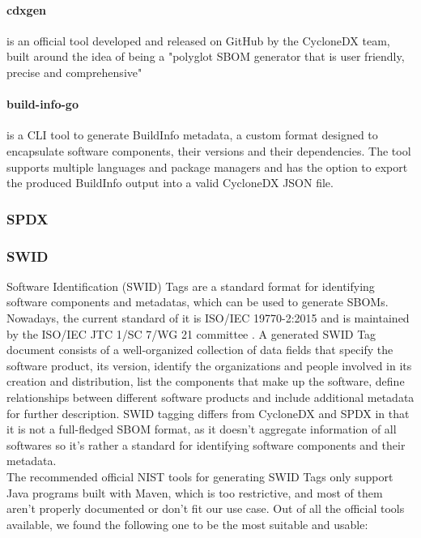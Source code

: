 \paragraph{cdxgen} is an official tool developed and released on GitHub by the CycloneDX team, built around the idea of being a "polyglot SBOM generator that is user friendly, precise and comprehensive"

\paragraph{build-info-go} is a CLI tool to generate BuildInfo metadata, a custom format designed to encapsulate software components, their versions and their dependencies. The tool supports multiple languages and package managers and has the option to export the produced BuildInfo output into a valid CycloneDX JSON file.

\subsubsection{SPDX}

\subsubsection{SWID}
Software Identification (SWID) Tags \cite{standards:sbom:swid} are a standard format for identifying software components and metadatas, which can be used to generate SBOMs. Nowadays, the current standard of it is ISO/IEC 19770-2:2015 \cite{standards:swid:iso19770-2:2015} and is maintained by the ISO/IEC JTC 1/SC 7/WG 21 committee \cite{standards:swid:committee}.
A generated SWID Tag document consists of a well-organized collection of data fields that specify the software product, its version, identify the organizations and people involved in its creation and distribution, list the components that make up the software, define relationships between different software products and include additional metadata for further description.
SWID tagging differs from CycloneDX and SPDX in that it is not a full-fledged SBOM format, as it doesn't aggregate information of all softwares so it's rather a standard for identifying software components and their metadata.
\\ The recommended official NIST tools for generating SWID Tags only support Java programs built with Maven, which is too restrictive, and most of them aren't properly documented or don't fit our use case. 
Out of all the official tools available, we found the following one to be the most suitable and usable:

